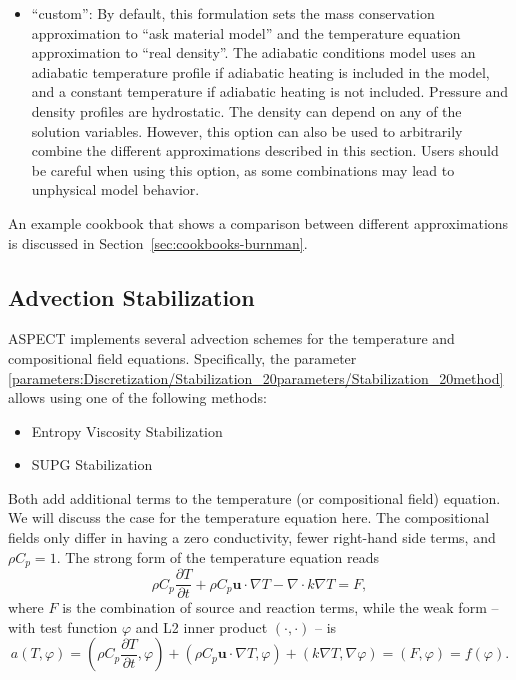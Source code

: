 \documentclass{article}
\newcommand{\aspect}{\textsc{ASPECT}}
\begin{document}
\begin{itemize}
\item
``custom'': By default, this formulation sets the mass conservation approximation 
to ``ask material model'' and the temperature equation approximation to ``real density''.
The adiabatic conditions model uses an adiabatic temperature profile if adiabatic heating
is included in the model, and a constant temperature if adiabatic heating is not included.
Pressure and density profiles are hydrostatic. The density can depend on any of the solution variables.
However, this option can also be used to arbitrarily combine the different approximations 
described in this section. Users should be careful when using this option, as some combinations
may lead to unphysical model behavior.
\end{itemize}

An example cookbook that shows a comparison between different approximations is discussed in Section~\ref{sec:cookbooks-burnman}.

\subsection{Advection Stabilization}
\label{sec:advection-stabilization}

\aspect{} implements several advection schemes for the temperature and compositional field
equations. Specifically, the parameter \ref{parameters:Discretization/Stabilization_20parameters/Stabilization_20method}
allows using one of the following methods:

\begin{itemize}
 \item Entropy Viscosity Stabilization
 \item SUPG Stabilization
\end{itemize}


Both add additional terms to the temperature (or compositional field) equation. We will discuss
the case for the temperature equation here. The compositional fields only differ in having
a zero conductivity, fewer right-hand side terms, and $\rho C_p=1$. The strong form of the temperature equation reads
\[
 \rho C_p \frac{\partial T}{\partial t} + \rho C_p \mathbf{u} \cdot \nabla T - \nabla \cdot k\nabla T = F,
\]
where $F$ is the combination of source and reaction terms,
while the weak form -- with test function $\varphi$ and L2 inner product $(\cdot,\cdot)$ -- is
\begin{equation}
a(T,\varphi) =
 \left(\rho C_p \frac{\partial T}{\partial t}, \varphi \right)
 + \left(\rho C_p \mathbf{u} \cdot \nabla T, \varphi \right)
 + \left( k \nabla T, \nabla \varphi \right) = (F,\varphi) = f(\varphi).
 \label{eqn:weak-form-for-advection}
\end{equation}
\end{document}
